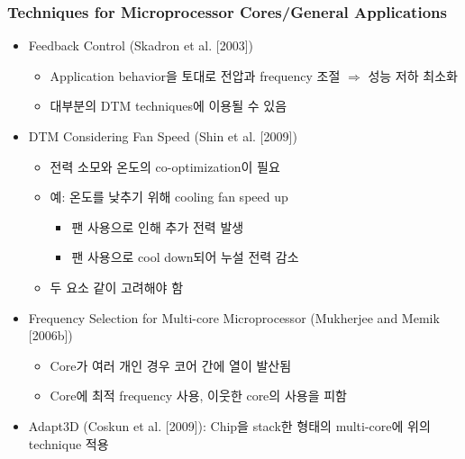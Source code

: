 \subsubsection*{Techniques for Microprocessor Cores/General Applications}
\begin{itemize}
    \item Feedback Control (Skadron et al. [2003])
    \begin{itemize}
        \item Application behavior을 토대로 전압과 frequency 조절 $\Rightarrow$ 성능 저하 최소화
        \item 대부분의 DTM techniques에 이용될 수 있음
    \end{itemize}
    \item DTM Considering Fan Speed (Shin et al. [2009])
    \begin{itemize}
        \item 전력 소모와 온도의 co-optimization이 필요
        \item 예: 온도를 낮추기 위해 cooling fan speed up
        \begin{itemize}
            \item 팬 사용으로 인해 추가 전력 발생
            \item 팬 사용으로 cool down되어 누설 전력 감소
        \end{itemize}
        \item 두 요소 같이 고려해야 함
    \end{itemize}
    \item Frequency Selection for Multi-core Microprocessor (Mukherjee and Memik [2006b])
    \begin{itemize}
        \item Core가 여러 개인 경우 코어 간에 열이 발산됨
        \item Core에 최적 frequency 사용, 이웃한 core의 사용을 피함
    \end{itemize}
    \item Adapt3D (Coskun et al. [2009]): Chip을 stack한 형태의 multi-core에 위의 technique 적용
\end{itemize}

